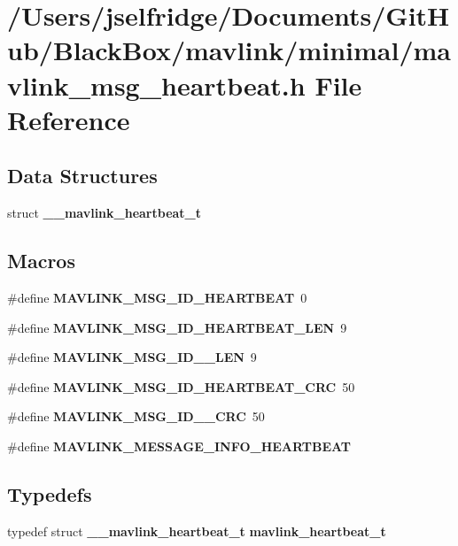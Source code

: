 \section{/\+Users/jselfridge/\+Documents/\+Git\+Hub/\+Black\+Box/mavlink/minimal/mavlink\+\_\+msg\+\_\+heartbeat.h File Reference}
\label{minimal_2mavlink__msg__heartbeat_8h}
\subsection*{Data Structures}
\begin{DoxyCompactItemize}
\item 
struct \textbf{ \+\_\+\+\_\+mavlink\+\_\+heartbeat\+\_\+t}
\end{DoxyCompactItemize}
\subsection*{Macros}
\begin{DoxyCompactItemize}
\item 
\#define \textbf{ M\+A\+V\+L\+I\+N\+K\+\_\+\+M\+S\+G\+\_\+\+I\+D\+\_\+\+H\+E\+A\+R\+T\+B\+E\+AT}~0
\item 
\#define \textbf{ M\+A\+V\+L\+I\+N\+K\+\_\+\+M\+S\+G\+\_\+\+I\+D\+\_\+\+H\+E\+A\+R\+T\+B\+E\+A\+T\+\_\+\+L\+EN}~9
\item 
\#define \textbf{ M\+A\+V\+L\+I\+N\+K\+\_\+\+M\+S\+G\+\_\+\+I\+D\+\_\+\_\+\+L\+EN}~9
\item 
\#define \textbf{ M\+A\+V\+L\+I\+N\+K\+\_\+\+M\+S\+G\+\_\+\+I\+D\+\_\+\+H\+E\+A\+R\+T\+B\+E\+A\+T\+\_\+\+C\+RC}~50
\item 
\#define \textbf{ M\+A\+V\+L\+I\+N\+K\+\_\+\+M\+S\+G\+\_\+\+I\+D\+\_\+\_\+\+C\+RC}~50
\item 
\#define \textbf{ M\+A\+V\+L\+I\+N\+K\+\_\+\+M\+E\+S\+S\+A\+G\+E\+\_\+\+I\+N\+F\+O\+\_\+\+H\+E\+A\+R\+T\+B\+E\+AT}
\end{DoxyCompactItemize}
\subsection*{Typedefs}
\begin{DoxyCompactItemize}
\item 
typedef struct \textbf{ \+\_\+\+\_\+mavlink\+\_\+heartbeat\+\_\+t} \textbf{ mavlink\+\_\+heartbeat\+\_\+t}
\end{DoxyCompactItemize}


